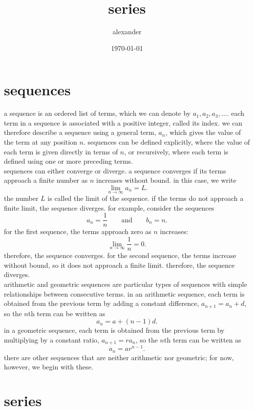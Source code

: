\documentclass{article}
\title{series}
\author{alexander}
\date{\today}
\begin{document}
\maketitle

\section{sequences}

a sequence is an ordered list of terms, which we can denote by $a_1,a_2,a_3,\ldots$. each term in a sequence is associated with a positive integer, called its index. we can therefore describe a sequence using a general term, $a_n$, which gives the value of the term at any position $n$. sequences can be defined explicitly, where the value of each term is given directly in terms of $n$, or recursively, where each term is defined using one or more preceding terms.\\

sequences can either converge or diverge. a sequence converges if its terms approach a finite number as $n$ increases without bound. in this case, we write
\[
\lim_{n\to\infty}a_n=L.
\]
the number $L$ is called the limit of the sequence. if the terms do not approach a finite limit, the sequence diverges. for example, consider the sequences
\[
a_n=\frac{1}{n}
\qquad \text{and} \qquad
b_n=n.
\]
for the first sequence, the terms approach zero as $n$ increases:
\[
\lim_{n\to\infty}\frac{1}{n}=0.
\]
therefore, the sequence converges. for the second sequence, the terms increase without bound, so it does not approach a finite limit. therefore, the sequence diverges.\\

arithmetic and geometric sequences are particular types of sequences with simple relationships between consecutive terms. in an arithmetic sequence, each term is obtained from the previous term by adding a constant difference, $a_{n+1}=a_n+d$, so the $n$th term can be written as
\[
a_n=a+(n-1)d.
\]
in a geometric sequence, each term is obtained from the previous term by multiplying by a constant ratio, $a_{n+1}=ra_n$, so the $n$th term can be written as
\[
a_n=ar^{n-1}.
\]
there are other sequences that are neither arithmetic nor geometric; for now, however, we begin with these.\\

\section{series}
\end{document}
